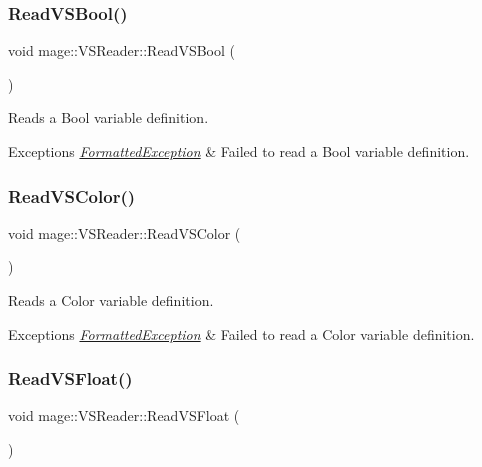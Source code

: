 \subsubsection{\texorpdfstring{Read\+V\+S\+Bool()}{ReadVSBool()}}
{\footnotesize\ttfamily void mage\+::\+V\+S\+Reader\+::\+Read\+V\+S\+Bool (\begin{DoxyParamCaption}{ }\end{DoxyParamCaption})\hspace{0.3cm}{\ttfamily [private]}}

Reads a Bool variable definition.


\begin{DoxyExceptions}{Exceptions}
{\em \hyperlink{classmage_1_1_formatted_exception}{Formatted\+Exception}} & Failed to read a Bool variable definition. \\
\hline
\end{DoxyExceptions}
\hypertarget{classmage_1_1_v_s_reader_a42bdfc1fcc6f385e0f88820491d53e04}{}\label{classmage_1_1_v_s_reader_a42bdfc1fcc6f385e0f88820491d53e04} 
\subsubsection{\texorpdfstring{Read\+V\+S\+Color()}{ReadVSColor()}}
{\footnotesize\ttfamily void mage\+::\+V\+S\+Reader\+::\+Read\+V\+S\+Color (\begin{DoxyParamCaption}{ }\end{DoxyParamCaption})\hspace{0.3cm}{\ttfamily [private]}}

Reads a Color variable definition.


\begin{DoxyExceptions}{Exceptions}
{\em \hyperlink{classmage_1_1_formatted_exception}{Formatted\+Exception}} & Failed to read a Color variable definition. \\
\hline
\end{DoxyExceptions}
\hypertarget{classmage_1_1_v_s_reader_a64c525d3d87ed248424e4eba359d9ecf}{}\label{classmage_1_1_v_s_reader_a64c525d3d87ed248424e4eba359d9ecf} 
\subsubsection{\texorpdfstring{Read\+V\+S\+Float()}{ReadVSFloat()}}
{\footnotesize\ttfamily void mage\+::\+V\+S\+Reader\+::\+Read\+V\+S\+Float (\begin{DoxyParamCaption}{ }\end{DoxyParamCaption})\hspace{0.3cm}{\ttfamily [private]}}

